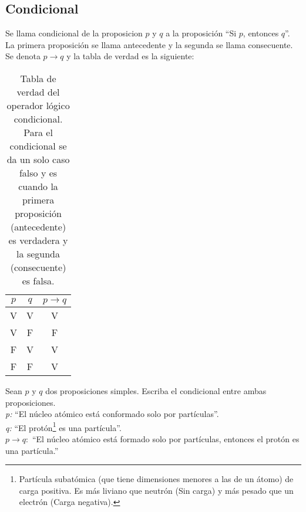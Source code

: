 \subsection{Condicional}
Se llama condicional de la proposicion $p$ y $q$ a la proposición ``Si $p$, entonces $q$''. La primera proposición se llama antecedente y la segunda se llama consecuente. Se denota $p\rightarrow q$ y la tabla de verdad es la siguiente:
\begin{table}[h!]
	\begin{center}
		\begin{tabular}{|c|c|c|}
\hline
$p$&$q$&$p\rightarrow q$\\
\hline
V&V&V\\
\hline
V&F&F\\
\hline
F&V&V\\
\hline
F&F&V\\
\hline
		\end{tabular}
	\end{center}
\caption[Tabla de verdad del operador lógico condicional.]{Tabla de verdad del operador lógico condicional. Para el condicional se da un solo caso falso y es cuando la primera proposición (antecedente) es verdadera y la segunda (consecuente) es falsa.}
\end{table}

\begin{myexample}
Sean $p$ y $q$ dos proposiciones simples. Escriba el condicional entre ambas proposiciones.\\

\noindent\textit{p:} ``El núcleo atómico está conformado solo por partículas''.\\
\textit{q:} ``El protón\footnote{Partícula subatómica (que tiene dimensiones menores a las de un átomo) de carga positiva. Es más liviano que neutrón (Sin carga) y más pesado que un electrón (Carga negativa).} es una partícula''.\\
\textit{$p\rightarrow q:$} ``El núcleo atómico está formado solo por partículas, entonces el protón es una partícula.''\\
\end{myexample}


